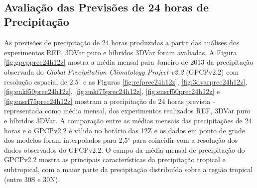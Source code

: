 \begin{figure}[H]
\begin{center}
{        }\\
    \end{center}
    \vspace{2mm}
    \legenda{}
  \label{fig:skill_gl_sa}
\end{figure}

\subsection{Avaliação das Previsões de 24 horas de Precipitação}
\label{sec:aval_prec}

As previsões de precipitação de 24 horas produzidas a partir das análises dos experimentos REF, 3DVar puro e híbridos 3DVar foram avaliadas. A Figura \ref{fig:gpcpprec24h12z} mostra a média mensal para Janeiro de 2013 da precipitação observada do \textit{Global Precipitation Climatology Project v2.2} (GPCPv2.2) com resolução espacial de 2,5$^{\circ}$ \cite{adleretal/2003} e as Figuras \ref{fig:refprec24h12z}, \ref{fig:3dvarprec24h12z}, \ref{fig:enkf50prec24h12z}, \ref{fig:enkf75prec24h12z}, \ref{fig:ensrf50prec24h12z} e \ref{fig:ensrf75prec24h12z} mostram a precipitação de 24 horas prevista - representada como média mensal, dos experimentos realizados REF, 3DVar puro e híbridos 3DVar. A comparação entre as médias mensais das precipitações de 24 horas e o GPCPv2.2 é válida no horário das 12Z e os dados em ponto de grade dos modelos foram interpolados para 2,5$^{\circ}$ para coincidir com a resolução dos dados observados do GPCPv2.2. O campo da média mensal de precipitação do GPCPv2.2 mostra as principais características da precipitação tropical e subtropical, com a maior parte da precipitação distribuída sobre a região tropical (entre 30S e 30N).

